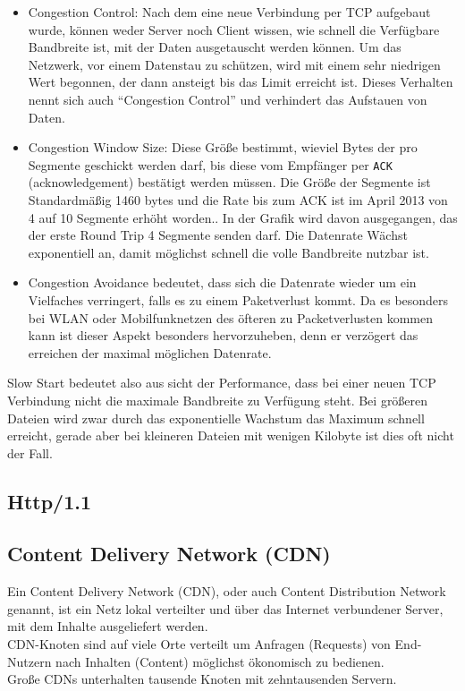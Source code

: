 		\begin{itemize}
			\item Congestion Control: Nach dem eine neue Verbindung per TCP aufgebaut wurde, können weder Server noch Client wissen, wie schnell die Verfügbare Bandbreite ist, mit der Daten ausgetauscht werden können. Um das Netzwerk, vor einem Datenstau zu schützen, wird mit einem sehr niedrigen Wert begonnen, der dann ansteigt bis das Limit erreicht ist. Dieses Verhalten nennt sich auch "`Congestion Control"' und verhindert das Aufstauen von Daten.
			\item Congestion Window Size: Diese Größe bestimmt, wieviel Bytes der pro Segmente geschickt werden darf, bis diese vom Empfänger per \texttt{ACK} (acknowledgement) bestätigt werden müssen. Die Größe der Segmente ist Standardmäßig 1460 bytes und die Rate bis zum ACK ist im April 2013 von 4 auf 10 Segmente erhöht worden.\autocite{grigorikSlowStart}. In der Grafik wird davon ausgegangen, das der erste Round Trip 4 Segmente senden darf. Die Datenrate Wächst exponentiell an, damit möglichst schnell die volle Bandbreite nutzbar ist.\\
			\item Congestion Avoidance bedeutet, dass sich die Datenrate wieder um ein Vielfaches verringert, falls es zu einem Paketverlust kommt. Da es besonders bei WLAN oder Mobilfunknetzen des öfteren zu Packetverlusten kommen kann ist dieser Aspekt besonders hervorzuheben, denn er verzögert das erreichen der maximal möglichen Datenrate.
		\end{itemize}

		Slow Start bedeutet also aus sicht der Performance, dass bei einer neuen TCP Verbindung nicht die maximale Bandbreite zu Verfügung steht. Bei größeren Dateien wird zwar durch das exponentielle Wachstum das Maximum schnell erreicht, gerade aber bei kleineren Dateien mit wenigen Kilobyte ist dies oft nicht der Fall.


	\subsection{Http/1.1}
	\label{sub:http_1_1}
	


	\subsection{Content Delivery Network (CDN)} %
	\label{sub:content_delivery_network}
		Ein Content Delivery Network (CDN), oder auch Content Distribution Network genannt, ist ein Netz lokal verteilter und über das Internet verbundener Server, mit dem Inhalte ausgeliefert werden.\\
		CDN-Knoten sind auf viele Orte verteilt um Anfragen (Requests) von End-Nutzern nach Inhalten (Content) möglichst ökonomisch zu bedienen.\\
		Große CDNs unterhalten tausende Knoten mit zehntausenden Servern.\autocite{wikipediaCDN}

